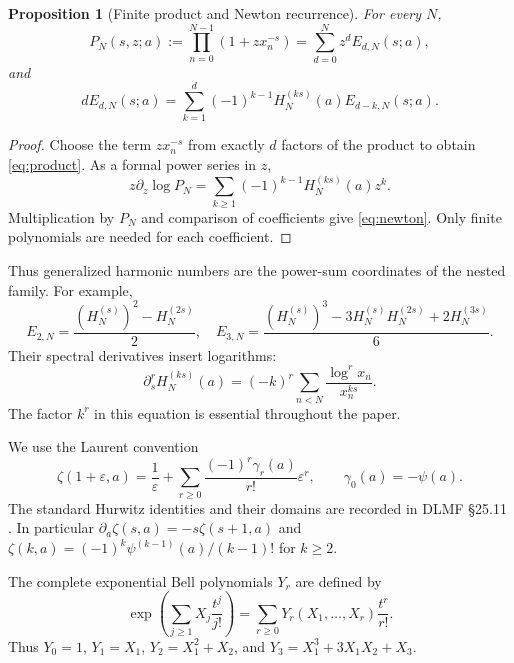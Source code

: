 \documentclass[11pt]{article}
\numberwithin{equation}{section}
\newtheorem{proposition}[theorem]{Proposition}
\theoremstyle{definition}\newtheorem{definition}[theorem]{Definition}
\theoremstyle{remark}\newtheorem{remark}[theorem]{Remark}
\newcommand{\eps}{\varepsilon}
\begin{document}
\begin{proposition}[Finite product and Newton recurrence]
For every $N$,
\begin{equation}
 P_N(s,z;a):=\prod_{n=0}^{N-1}(1+z x_n^{-s})
       =\sum_{d=0}^N z^d E_{d,N}(s;a),
 \label{eq:product}
\end{equation}
and
\begin{equation}
 d E_{d,N}(s;a)=\sum_{k=1}^d(-1)^{k-1}
       H_N^{(ks)}(a) E_{d-k,N}(s;a).
 \label{eq:newton}
\end{equation}
\end{proposition}
\begin{proof}
Choose the term $zx_n^{-s}$ from exactly $d$ factors of the product to obtain
\eqref{eq:product}. As a formal power series in $z$,
\[
 z\partial_z\log P_N
 =\sum_{k\ge1}(-1)^{k-1}H_N^{(ks)}(a)z^k.
\]
Multiplication by $P_N$ and comparison of coefficients give
\eqref{eq:newton}. Only finite polynomials are needed for each coefficient.
\end{proof}
Thus generalized harmonic numbers are the power-sum coordinates of the
nested family. For example,
\[
 E_{2,N}=\frac{(H_N^{(s)})^2-H_N^{(2s)}}2,\quad
 E_{3,N}=\frac{(H_N^{(s)})^3-3H_N^{(s)}H_N^{(2s)}+2H_N^{(3s)}}6.
\]
Their spectral derivatives insert logarithms:
\begin{equation}
 \partial_s^r H_N^{(ks)}(a)
   =(-k)^r\sum_{n<N}\frac{\log^r x_n}{x_n^{ks}}.
 \label{eq:harmoniclog}
\end{equation}
The factor $k^r$ in this equation is essential throughout the paper.

We use the Laurent convention
\begin{equation}
 \zeta(1+\eps,a)=\frac1\eps+
     \sum_{r\ge0}\frac{(-1)^r\gamma_r(a)}{r!}\eps^r,
 \qquad \gamma_0(a)=-\psi(a).
 \label{eq:stieltjes}
\end{equation}
The standard Hurwitz identities and their domains are recorded in DLMF
\S25.11 \cite{DLMFzeta}. In particular
$\partial_a\zeta(s,a)=-s\zeta(s+1,a)$ and
$\zeta(k,a)=(-1)^k\psi^{(k-1)}(a)/(k-1)!$ for $k\ge2$.

The complete exponential Bell polynomials $Y_r$ are defined by
\begin{equation}
 \exp\left(\sum_{j\ge1}X_j\frac{t^j}{j!}\right)
       =\sum_{r\ge0}Y_r(X_1,\ldots,X_r)\frac{t^r}{r!}.
 \label{eq:Bell}
\end{equation}
Thus $Y_0=1$, $Y_1=X_1$, $Y_2=X_1^2+X_2$, and
$Y_3=X_1^3+3X_1X_2+X_3$.
\end{document}
